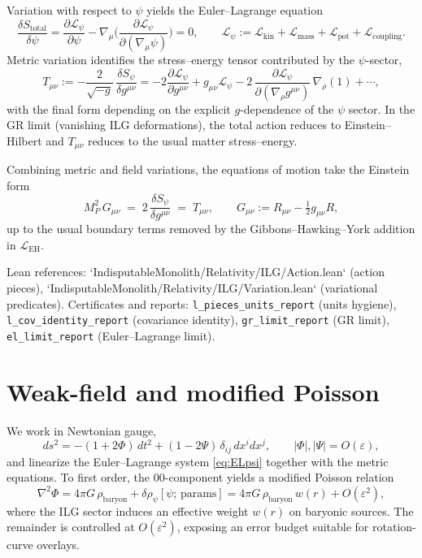 \documentclass[11pt]{article}
\newcommand{\Stotal}{S_{\mathrm{total}}}
\newcommand{\Tmunu}{T_{\mu\nu}}
\begin{document}
Variation with respect to $\psi$ yields the Euler--Lagrange equation
\begin{equation}
  \frac{\delta \Stotal}{\delta \psi} 
   = \frac{\partial \mathcal{L}_\psi}{\partial \psi}
     - \nabla_\mu \Big( \frac{\partial \mathcal{L}_\psi}{\partial (\nabla_\mu \psi)} \Big) = 0, 
  \qquad \mathcal{L}_\psi := \mathcal{L}_{\mathrm{kin}} + \mathcal{L}_{\mathrm{mass}} + \mathcal{L}_{\mathrm{pot}} + \mathcal{L}_{\mathrm{coupling}}.
  \label{eq:ELpsi}
\end{equation}
Metric variation identifies the stress--energy tensor contributed by the $\psi$-sector,
\begin{equation}
  \Tmunu 
   := -\frac{2}{\sqrt{-g}}\, \frac{\delta S_\psi}{\delta g^{\mu\nu}} 
   = -2 \frac{\partial \mathcal{L}_\psi}{\partial g^{\mu\nu}} 
     + g_{\mu\nu} \mathcal{L}_\psi 
     - 2\, \frac{\partial \mathcal{L}_\psi}{\partial (\nabla_\rho g^{\mu\nu})}\, \nabla_\rho(1) 
     + \cdots,
  \label{eq:Tmunu}
\end{equation}
with the final form depending on the explicit $g$-dependence of the $\psi$ sector. In the GR limit (vanishing ILG deformations), the total action reduces to Einstein--Hilbert and $\Tmunu$ reduces to the usual matter stress--energy.

Combining metric and field variations, the equations of motion take the Einstein form
\begin{equation}
  M_P^2\, G_{\mu\nu} \;=\; 2\, \frac{\delta S_\psi}{\delta g^{\mu\nu}} 
  \;=\; \Tmunu, \qquad G_{\mu\nu} := R_{\mu\nu} - \tfrac{1}{2} g_{\mu\nu} R,
\end{equation}
up to the usual boundary terms removed by the Gibbons--Hawking--York addition in $\mathcal{L}_{\mathrm{EH}}$.

Lean references: `IndisputableMonolith/Relativity/ILG/Action.lean` (action pieces), `IndisputableMonolith/Relativity/ILG/Variation.lean` (variational predicates). Certificates and reports: \texttt{l\_pieces\_units\_report} (units hygiene), \texttt{l\_cov\_identity\_report} (covariance identity), \texttt{gr\_limit\_report} (GR limit), \texttt{el\_limit\_report} (Euler--Lagrange limit).

\section{Weak-field and modified Poisson}
We work in Newtonian gauge,
\begin{equation}
  ds^2 = -(1+2\Phi)\,dt^2 + (1-2\Psi)\,\delta_{ij}\,dx^i dx^j, \qquad |\Phi|,|\Psi| = O(\varepsilon),
\end{equation}
and linearize the Euler--Lagrange system \eqref{eq:ELpsi} together with the metric equations. To first order, the $00$-component yields a modified Poisson relation
\begin{equation}
  \nabla^2 \Phi = 4\pi G\,\rho_{\mathrm{baryon}} + \delta\rho_\psi[\psi;\,\text{params}] 
  = 4\pi G\,\rho_{\mathrm{baryon}}\, w(r) + O(\varepsilon^2),
  \label{eq:poisson}
\end{equation}
where the ILG sector induces an effective weight $w(r)$ on baryonic sources. The remainder is controlled at $O(\varepsilon^2)$, exposing an error budget suitable for rotation-curve overlays.
\end{document}
